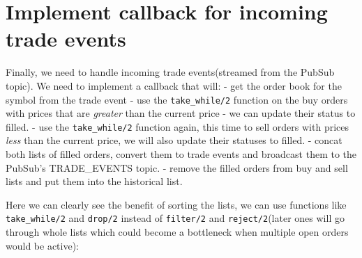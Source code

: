 \documentclass[
]{book}
\begin{document}
\hypertarget{implement-callback-for-incoming-trade-events}{%
\section{Implement callback for incoming trade events}\label{implement-callback-for-incoming-trade-events}}

Finally, we need to handle incoming trade events(streamed from the PubSub topic). We need to implement a callback that will:
- get the order book for the symbol from the trade event
- use the \texttt{take\_while/2} function on the buy orders with prices that are \emph{greater} than the current price - we can update their status to filled.
- use the \texttt{take\_while/2} function again, this time to sell orders with prices \emph{less} than the current price, we will also update their statuses to filled.
- concat both lists of filled orders, convert them to trade events and broadcast them to the PubSub's TRADE\_EVENTS topic.
- remove the filled orders from buy and sell lists and put them into the historical list.

Here we can clearly see the benefit of sorting the lists, we can use functions like \texttt{take\_while/2} and \texttt{drop/2} instead of \texttt{filter/2}
and \texttt{reject/2}(later ones will go through whole lists which could become a bottleneck when multiple open orders would be active):
\end{document}
